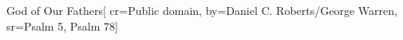{God of Our Fathers}[
    cr={Public domain},
    by={Daniel C. Roberts/George Warren},
    sr={Psalm 5, Psalm 78}]
